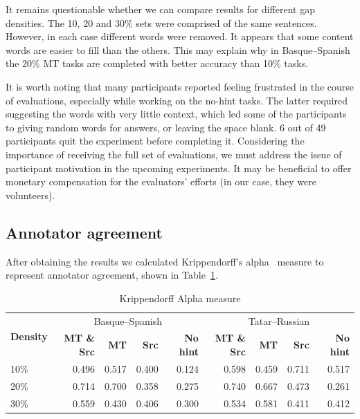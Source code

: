 \documentclass[11pt]{article}
\newcommand{\comment}[1]{}
\begin{document}
It remains questionable whether we can compare results for different gap densities. The 10, 20 and 30\% sets were comprised
of the same sentences. However, in each case different words were removed. It appears
that some content words are easier to fill than the others. This may explain why in
Basque--Spanish the 20\% MT tasks are completed with better accuracy than 10\% tasks.\comment{MLF: I think this shows that our statistics are weak, should we say something to excuse ourselves?}

It is worth noting that many participants reported feeling frustrated in
the course of evaluations, especially while working on the no-hint tasks. The latter required suggesting the words with very little context, which led some of the participants to giving random words for answers, or leaving the space blank. 6 out of 49
participants quit the experiment before completing it. Considering the importance of receiving the full set of evaluations, we must address the issue of participant motivation in the upcoming experiments. It may be beneficial to offer monetary compensation for the evaluators' efforts (in our case, they were volunteers).

\subsection{Annotator agreement}
After obtaining the results we calculated Krippendorff's alpha~\citep{krippendorff70} measure to represent annotator agreement, shown in Table~\ref{table:alpha}. 
\begin{table}
\centering
  \begin{tabular}{|l|r|r|r|r|r|r|r|r|}
  \hline
 \multirow{2}{*}{\textbf{Density}} & \multicolumn{4}{|c|}{Basque--Spanish}&\multicolumn{4}{|c|}{Tatar--Russian} \\\cline{2-9}
                                            & \textbf{MT \& Src} & \textbf{MT} & \textbf{Src} & \textbf{No hint}& \textbf{MT \& Src} & \textbf{MT} & \textbf{Src} & \textbf{No hint} \\
\hline
10\%&0.496&0.517&0.400&0.124&0.598&0.459 &0.711 &0.517\\
20\%&0.714&0.700&0.358&0.275&0.740&0.667 &0.473 &0.261\\
30\%&0.559&0.430&0.406&0.300&0.534&0.581 &0.411 &0.412\\

\hline
\end{tabular}
\caption{Krippendorff Alpha measure} 
\label{table:alpha}
\end{table}
\end{document}
